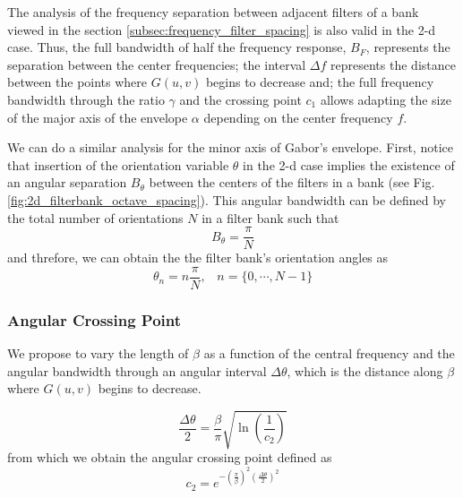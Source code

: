 \documentclass[journal]{IEEEtran}
\begin{document}
The analysis of the frequency separation between adjacent filters of a bank viewed in the section \ref{subsec:frequency_filter_spacing} is also valid in the 2-d case. Thus, the full bandwidth of half the frequency response, $B_F$, represents the separation between the center frequencies; the interval $\Delta f$ represents the distance between the points where $G(u, v)$ begins to decrease and; the full frequency bandwidth through the ratio $\gamma$ and the crossing point $c_1$ allows adapting the size of the major axis of the envelope $\alpha$ depending on the center frequency $f$.

We can do a similar analysis for the minor axis of Gabor's envelope. First, notice that insertion of the orientation variable $\theta$ in the 2-d case implies the existence of an angular separation $B_{\theta}$ between the centers of the filters in a bank (see Fig. \ref{fig:2d_filterbank_octave_spacing}). This angular bandwidth can be defined by the total number of orientations $N$ in a filter bank such that
\begin{equation}\label{eq:angular_bandwidth}
    B_{\theta} = \frac{\pi}{N}
\end{equation}
and threfore, we can obtain the the filter bank's orientation angles as 
\begin{equation}\label{eq:filterbank_angles}
    \theta_n = n \frac{\pi}{N} \textrm{,} \quad n = \{0, \cdots, N-1\}
\end{equation}

\subsubsection{Angular Crossing Point}
We propose to vary the length of $\beta$ as a function of the central frequency and the angular bandwidth through an angular interval $\Delta \theta$, which is the distance along $\beta$ where $G(u, v)$ begins to decrease.

\begin{equation}\label{eq:orientation_interval_crossing_point}
    \frac{\Delta \theta}{2} = \frac{\beta}{\pi}\sqrt{\ln \left(\frac{1}{c_2}\right)}
\end{equation}
from which we obtain the angular crossing point defined as
\begin{equation}\label{eq:angular_crossing_point}
    c_2 = e^{-\left(\frac{\pi}{\beta} \right)^2 \left(\frac{\Delta \theta}{2}\right)^2 }
\end{equation}
\end{document}
